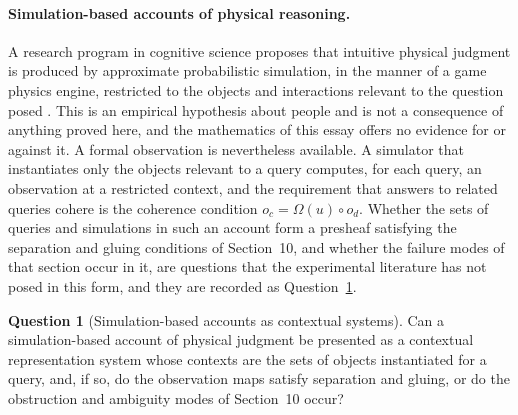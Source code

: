 \documentclass[11pt]{article}
\theoremstyle{definition}
\newtheorem{question}[theorem]{Question}
\theoremstyle{remark}
\begin{document}
\paragraph{Simulation-based accounts of physical reasoning.} A research program in cognitive science proposes that intuitive physical judgment is produced by approximate probabilistic simulation, in the manner of a game physics engine, restricted to the objects and interactions relevant to the question posed \cite{ullman}. This is an empirical hypothesis about people and is not a consequence of anything proved here, and the mathematics of this essay offers no evidence for or against it. A formal observation is nevertheless available. A simulator that instantiates only the objects relevant to a query computes, for each query, an observation at a restricted context, and the requirement that answers to related queries cohere is the coherence condition $o_c=\Omega(u)\circ o_d$. Whether the sets of queries and simulations in such an account form a presheaf satisfying the separation and gluing conditions of Section~10, and whether the failure modes of that section occur in it, are questions that the experimental literature has not posed in this form, and they are recorded as Question~\ref{q:simulation}.

\begin{question}[Simulation-based accounts as contextual systems]\label{q:simulation}
Can a simulation-based account of physical judgment be presented as a contextual representation system whose contexts are the sets of objects instantiated for a query, and, if so, do the observation maps satisfy separation and gluing, or do the obstruction and ambiguity modes of Section~10 occur?
\end{question}
\end{document}
